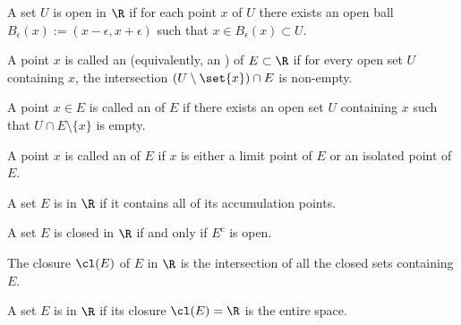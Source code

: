 \documentclass[onesided]{ccg-pset}
\author{Colton Grainger}
\date{\today}
\begin{document}
\maketitle

\begin{defn}
    \label{defn:open_sets}
    A set $U$ is open in $\R$ if for each point $x$ of $U$ there exists an open ball $B_\epsilon(x) := (x-\epsilon, x+ \epsilon)$ such that  $x \in B_\epsilon(x) \subset U$.
\end{defn}

\begin{defn}
    \label{defn:limit_points}
    A point $x$ is called an  (equivalently, an ) of $E \subset \R$ if for every open set $U$ containing $x$, the intersection $(U\setminus \set{x}) \cap E$ is non-empty.
\end{defn}

\begin{defn}
    \label{defn:isolated_points}
    A point $x \in E$ is called  an  of $E$ if there exists an open set $U$ containing $x$ such that $U \cap E\setminus\{x\}$ is empty.
\end{defn}

\begin{defn}
    \label{defn:adherent_points}
    A point $x$ is called  an  of $E$ if $x$ is either a limit point of $E$ or an isolated point of $E$.
\end{defn}

\begin{defn}
    \label{defn:closed_sets}
    A set $E$ is  in $\R$ if it contains all of its accumulation points.
\end{defn}

\begin{thm}
    \label{thm:open_complements_are_closed}
    A set $E$ is closed in $\R$ if and only if $E^c$ is open.
\end{thm}

\begin{defn}[Closure]
    \label{defn:closure}
    The closure $\cl(E)$ of $E$ in $\R$ is the intersection of all the closed sets containing $E$.
\end{defn}

\begin{defn}[Dense in $\R$]
    \label{defn:dense_in_r_}
    A set $E$ is  in $\R$ if its closure $\cl(E) = \R$ is the entire space.
\end{defn}
\end{document}
